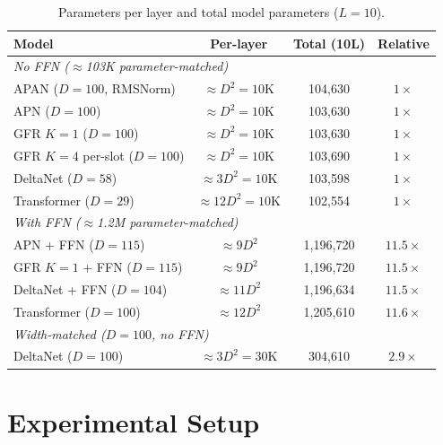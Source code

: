\documentclass[11pt,a4paper]{article}
\begin{document}
\begin{table}[h]
\centering
\caption{Parameters per layer and total model parameters ($L=10$).}
\label{tab:params}
\begin{tabular}{lccc}
\toprule
\textbf{Model} & \textbf{Per-layer} & \textbf{Total (10L)} & \textbf{Relative} \\
\midrule
\multicolumn{4}{l}{\textit{No FFN ($\approx$103K parameter-matched)}} \\
\midrule
APAN ($D=100$, RMSNorm) & $\approx D^2 = 10$K & 104,630 & $1\times$ \\
APN ($D=100$) & $\approx D^2 = 10$K & 103,630 & $1\times$ \\
GFR $K{=}1$ ($D=100$) & $\approx D^2 = 10$K & 103,630 & $1\times$ \\
GFR $K{=}4$ per-slot ($D=100$) & $\approx D^2 = 10$K & 103,690 & $1\times$ \\
DeltaNet ($D=58$) & $\approx 3D^2 = 10$K & 103,598 & $1\times$ \\
Transformer ($D=29$) & $\approx 12D^2 = 10$K & 102,554 & $1\times$ \\
\midrule
\multicolumn{4}{l}{\textit{With FFN ($\approx$1.2M parameter-matched)}} \\
\midrule
APN + FFN ($D=115$) & $\approx 9D^2$ & 1,196,720 & $11.5\times$ \\
GFR $K{=}1$ + FFN ($D=115$) & $\approx 9D^2$ & 1,196,720 & $11.5\times$ \\
DeltaNet + FFN ($D=104$) & $\approx 11D^2$ & 1,196,634 & $11.5\times$ \\
Transformer ($D=100$) & $\approx 12D^2$ & 1,205,610 & $11.6\times$ \\
\midrule
\multicolumn{4}{l}{\textit{Width-matched ($D=100$, no FFN)}} \\
\midrule
DeltaNet ($D=100$) & $\approx 3D^2 = 30$K & 304,610 & $2.9\times$ \\
\bottomrule
\end{tabular}
\end{table}

\section{Experimental Setup}
\end{document}

